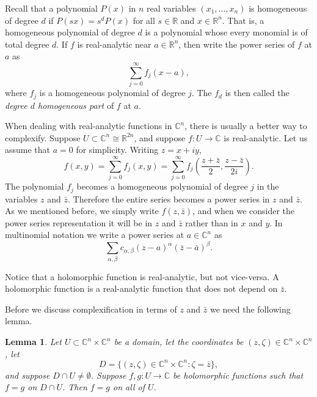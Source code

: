 \documentclass[12pt,openany]{book}
\newcommand{\C}{{\mathbb{C}}}
\newcommand{\R}{{\mathbb{R}}}
\newcommand{\myindex}[1]{#1\index{#1}}
\theoremstyle{plain}
\newtheorem{lemma}[thm]{Lemma}
\theoremstyle{remark}
\theoremstyle{definition}
\theoremstyle{exercise}
\theoremstyle{example}
\begin{document}
Recall that a polynomial $P(x)$ in $n$ real variables $(x_1,\ldots,x_n)$ is homogeneous of degree $d$ if
$P(s x) = s^d P(x)$ for all $s \in \R$ and $x \in \R^n$.
That is, a homogeneous polynomial of degree $d$ is a polynomial whose
every monomial
is of total degree $d$.
If $f$ is real-analytic near $a \in \R^n$, then
write the power series of $f$ at $a$ as
\begin{equation*}
\sum_{j=0}^{\infty} f_j(x-a) ,
\end{equation*}
where $f_j$ is a homogeneous polynomial of degree $j$.  The $f_d$ is then
called the
\emph{\myindex{degree $d$ homogeneous part}} of $f$
at $a$.

When dealing with real-analytic functions in $\C^n$, there is usually a better
way to complexify.
Suppose $U \subset \C^n \cong \R^{2n}$, and suppose $f \colon U \to
\C$ is real-analytic.  Let us assume that $a=0$ for simplicity.
Writing $z = x+iy$,
\begin{equation*}
f(x,y)
= 
\sum_{j=0}^\infty
f_j(x,y)
= 
\sum_{j=0}^\infty
f_j\left(
\frac{z+\bar{z}}{2},
\frac{z-\bar{z}}{2i}\right) .
\end{equation*}
The polynomial $f_j$ becomes a homogeneous polynomial of degree $j$
in the variables $z$ and $\bar{z}$.  Therefore the entire
series becomes a power series in $z$ and $\bar{z}$.  As we mentioned before,
we simply write $f(z,\bar{z})$, and when we consider the
power series representation it will be in $z$ and $\bar{z}$ rather than
in $x$ and $y$.
In multinomial notation we write a power series at $a \in \C^n$ as
\begin{equation*}
\sum_{\alpha,\beta} c_{\alpha,\beta} {(z-a)}^\alpha
{(\bar{z}-\bar{a})}^\beta .
\end{equation*}

Notice that a holomorphic function
is real-analytic, but not vice-versa.  A holomorphic function
is a real-analytic function that does not depend on $\bar{z}$.

Before we discuss complexification in terms of $z$ and $\bar{z}$ we need
the following lemma.

\begin{lemma}
Let $U \subset \C^n \times \C^n$ be a domain, let the coordinates be $(z,\zeta) \in \C^n \times
\C^n$, let
\begin{equation*}
D = \bigl\{ (z,\zeta) \in \C^n \times \C^n : \zeta = \bar{z} \bigr\},
\end{equation*}
and suppose $D \cap U \not= \emptyset$.
Suppose $f,g \colon U \to \C$ be holomorphic functions such that
$f=g$ on $D \cap U$.  Then $f=g$ on all of $U$.
\end{lemma}
\end{document}
